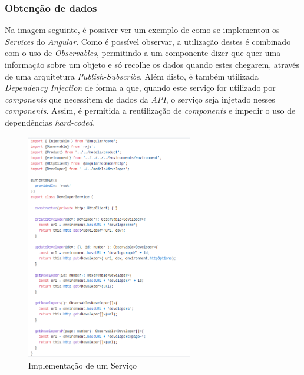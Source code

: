 \documentclass[10pt,english]{article}
\begin{document}
\subsubsection{Obtenção de dados}
Na imagem seguinte, é possiver ver um exemplo de como se implementou os \textit{Services} do \textit{Angular}. Como é possível observar, a utilização destes é combinado com o uso de \textit{Observables}, permitindo a um componente dizer que quer uma informação sobre um objeto e só recolhe os dados quando estes chegarem, através de uma arquitetura \textit{Publish-Subscribe}. Além disto, é também utilizada \textit{Dependency Injection} de forma a que, quando este serviço for utilizado por \textit{components} que necessitem de dados da \textit{API}, o serviço seja injetado nesses \textit{components}. Assim, é permitida a reutilização de \textit{components} e impedir o uso de dependências \textit{hard-coded}.
\begin{figure}[!h]
        \centering
        \includegraphics[width=275]{images/service1.png}
        \caption{Implementação de um Serviço}
\end{figure}
\clearpage
\end{document}
